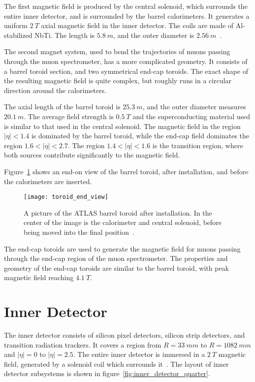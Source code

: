 The first magnetic field is produced by the central solenoid, which surrounds the entire inner detector,
and is surrounded by the barrel calorimeters.
It generates a uniform $2~T$ axial magnetic field in the inner detector.
The coils are made of Al-stabilized NbTi. The length is $5.8~m$, and the outer diameter is $2.56~m$~\cite{atlas-detector-2008}.

The second magnet system, used to bend the trajectories of muons passing through the muon spectrometer,
has a more complicated geometry.
It consists of a barrel toroid section, and two symmetrical end-cap toroids.
The exact shape of the resulting magnetic field is quite complex,
but roughly runs in a circular direction around the calorimeters.

The axial length of the barrel toroid is $25.3~m$, and the outer diameter measures $20.1~m$.
The average field strength is $0.5~T$ and the superconducting material used is similar to that used in the
central solenoid\cite{atlas-detector-2008}.
The magnetic field in the region $|\eta|<1.4$ is dominated by the barrel toroid,
while the end-cap field dominates the region $1.6 < |\eta| < 2.7$.
The region $1.4 < |\eta| < 1.6$ is the transition region, where both sources contribute significantly to the magnetic field.

Figure~\ref{fig:toroid_end_view} shows an end-on view of the barrel toroid, after installation,
and before the calorimeters are inserted.

\begin{figure}[!ht]\centering
\texttt{[image: toroid\_end\_view]}
\caption{A picture of the ATLAS barrel toroid after installation.
In the center of the image is the calorimeter and central solenoid, before being moved into the final position~\cite{atlas-detector-2008}.}
\label{fig:toroid_end_view}
\end{figure}

The end-cap toroids are used to generate the magnetic field for muons passing through the end-cap region of the muon spectrometer.
The properties and geometry of the end-cap toroids are similar to the barrel toroid,
with peak magnetic field reaching $4.1~T$\cite{atlas-detector-2008}.

\section{Inner Detector}\label{sec:inner_detector}
The inner detector consists of silicon pixel detectors, silicon strip detectors, and transition radiation trackers.
It covers a region from $R = 33~mm$ to $R = 1082~mm$ and $|\eta| = 0$ to $|\eta| = 2.5$.
The entire inner detector is immersed in a $2~T$ magnetic field, generated by a
solenoid coil which surrounds it~\cite{atlas-detector-2008}.
The layout of inner detector subsystems is shown in figure~\ref{fig:inner_detector_quarter}.

